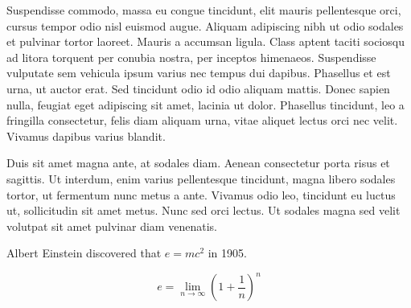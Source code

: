 \documentclass[11pt,a4paper,sans]{moderncv}
\begin{document}
Suspendisse commodo, massa eu congue tincidunt, elit mauris pellentesque orci, cursus tempor odio nisl euismod augue. Aliquam adipiscing nibh ut odio sodales et pulvinar tortor laoreet. Mauris a accumsan ligula. Class aptent taciti sociosqu ad litora torquent per conubia nostra, per inceptos himenaeos. Suspendisse vulputate sem vehicula ipsum varius nec tempus dui dapibus. Phasellus et est urna, ut auctor erat. Sed tincidunt odio id odio aliquam mattis. Donec sapien nulla, feugiat eget adipiscing sit amet, lacinia ut dolor. Phasellus tincidunt, leo a fringilla consectetur, felis diam aliquam urna, vitae aliquet lectus orci nec velit. Vivamus dapibus varius blandit.

Duis sit amet magna ante, at sodales diam. Aenean consectetur porta risus et sagittis. Ut interdum, enim varius pellentesque tincidunt, magna libero sodales tortor, ut fermentum nunc metus a ante. Vivamus odio leo, tincidunt eu luctus ut, sollicitudin sit amet metus. Nunc sed orci lectus. Ut sodales magna sed velit volutpat sit amet pulvinar diam venenatis.

Albert Einstein discovered that $e=mc^2$ in 1905.

\[ e=\lim_{n \to \infty} \left(1+\frac{1}{n}\right)^n \]

\makeletterclosing
\end{document}
